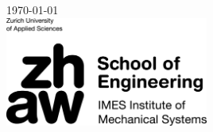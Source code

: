 \begin{titlepage}


    {\large \today}\\[2cm] 


    \includegraphics[width=0.5\textwidth]{img/en-zhaw-imes-sw.png}\\[2cm]



    \vfill %

\end{titlepage}
